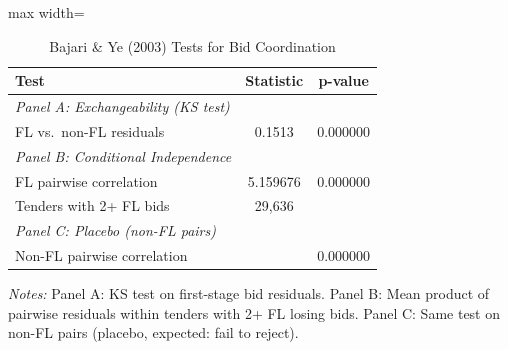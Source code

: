 \begin{table}[htbp]
\centering
\caption{Bajari \& Ye (2003) Tests for Bid Coordination}
\label{tab:bajari_ye}
\begin{adjustbox}{max width=\textwidth}
\begin{threeparttable}
\small
\begin{tabular}{lcc}
\toprule
Test & Statistic & p-value \\
\midrule
\textit{Panel A: Exchangeability (KS test)} & & \\
\quad FL vs.\ non-FL residuals & 0.1513 & 0.000000 \\
[6pt]
\textit{Panel B: Conditional Independence} & & \\
\quad FL pairwise correlation & 5.159676 & 0.000000 \\
\quad Tenders with 2+ FL bids & 29,636 & \\
[6pt]
\textit{Panel C: Placebo (non-FL pairs)} & & \\
\quad Non-FL pairwise correlation & & 0.000000 \\
\bottomrule
\end{tabular}
\begin{tablenotes}
\small
\item \textit{Notes:} Panel A: KS test on first-stage bid residuals.
Panel B: Mean product of pairwise residuals within tenders with 2+ FL losing bids.
Panel C: Same test on non-FL pairs (placebo, expected: fail to reject).
\end{tablenotes}
\end{threeparttable}
\end{adjustbox}
\end{table}
